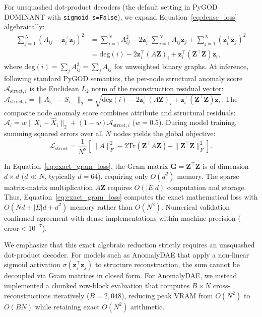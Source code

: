 \documentclass[11pt,a4paper]{article}
\begin{document}
For unsquashed dot-product decoders (the default setting in PyGOD DOMINANT with \texttt{sigmoid\_s=False}), we expand Equation~\eqref{eq:dense_loss} algebraically:
\begin{align}
\sum_{j=1}^N \left(A_{ij} - \mathbf{z}_i^\top \mathbf{z}_j\right)^2 &= \sum_{j=1}^N A_{ij}^2 - 2 \mathbf{z}_i^\top \sum_{j=1}^N A_{ij} \mathbf{z}_j + \sum_{j=1}^N (\mathbf{z}_i^\top \mathbf{z}_j)^2 \nonumber \\
&= \mathrm{deg}(i) - 2 \mathbf{z}_i^\top \left(A \mathbf{Z}\right)_i + \mathbf{z}_i^\top \left(\mathbf{Z}^\top \mathbf{Z}\right) \mathbf{z}_i,
\label{eq:gram_identity}
\end{align}
where $\mathrm{deg}(i) = \sum_j A_{ij}^2 = \sum_j A_{ij}$ for unweighted binary graphs. At inference, following standard PyGOD semantics, the per-node structural anomaly score $\mathcal{A}_{\mathrm{struct}, i}$ is the Euclidean $L_2$ norm of the reconstruction residual vector: $\mathcal{A}_{\mathrm{struct}, i} = \|A_{i,:} - \hat{S}_{i,:}\|_2 = \sqrt{\mathrm{deg}(i) - 2 \mathbf{z}_i^\top (A \mathbf{Z})_i + \mathbf{z}_i^\top (\mathbf{Z}^\top \mathbf{Z}) \mathbf{z}_i}$. The composite node anomaly score combines attribute and structural residuals: $\mathcal{A}_i = w \|X_i - \hat{X}_i\|_2 + (1 - w) \mathcal{A}_{\mathrm{struct}, i}$ ($w=0.5$). During model training, summing squared errors over all $N$ nodes yields the global objective:
\begin{equation}
\mathcal{L}_{\mathrm{struct}} = \frac{1}{N^2} \left[ \|A\|_F^2 - 2 \mathrm{Tr}\left(\mathbf{Z}^\top A \mathbf{Z}\right) + \|\mathbf{Z}^\top \mathbf{Z}\|_F^2 \right].
\label{eq:exact_gram_loss}
\end{equation}

In Equation~\eqref{eq:exact_gram_loss}, the Gram matrix $\mathbf{G} = \mathbf{Z}^\top \mathbf{Z}$ is of dimension $d \times d$ ($d \ll N$, typically $d=64$), requiring only $O(d^2)$ memory. The sparse matrix-matrix multiplication $A \mathbf{Z}$ requires $O(|E|d)$ computation and storage. Thus, Equation~\eqref{eq:exact_gram_loss} computes the exact mathematical loss with $O(N d + |E| d + d^2)$ memory rather than $O(N^2)$. Numerical validation confirmed agreement with dense implementations within machine precision ($\text{error} < 10^{-7}$).

We emphasize that this exact algebraic reduction strictly requires an unsquashed dot-product decoder. For models such as AnomalyDAE that apply a non-linear sigmoid activation $\sigma(\mathbf{z}_i^\top \mathbf{z}_j)$ to structure reconstruction, the sum cannot be decoupled via Gram matrices in closed form. For AnomalyDAE, we instead implemented a chunked row-block evaluation that computes $B \times N$ cross-reconstructions iteratively ($B=2,048$), reducing peak VRAM from $O(N^2)$ to $O(B N)$ while retaining exact $O(N^2)$ arithmetic.
\end{document}
